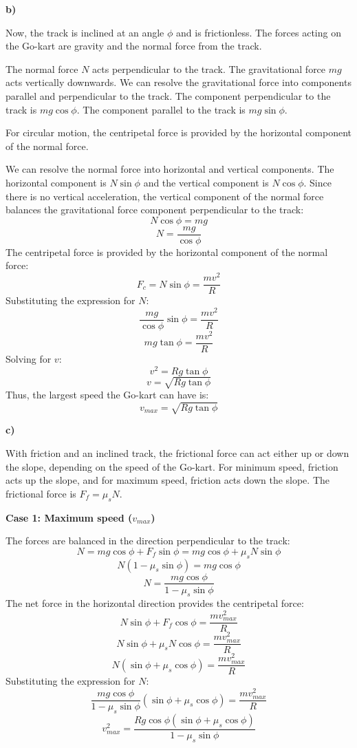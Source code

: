 \documentclass{article}
\begin{document}
\textbf{b)}

Now, the track is inclined at an angle $\phi$ and is frictionless. The forces acting on the Go-kart are gravity and the normal force from the track.

The normal force $N$ acts perpendicular to the track. The gravitational force $mg$ acts vertically downwards. We can resolve the gravitational force into components parallel and perpendicular to the track.
The component perpendicular to the track is $mg\cos\phi$. The component parallel to the track is $mg\sin\phi$.

For circular motion, the centripetal force is provided by the horizontal component of the normal force.

We can resolve the normal force into horizontal and vertical components. The horizontal component is $N\sin\phi$ and the vertical component is $N\cos\phi$.
Since there is no vertical acceleration, the vertical component of the normal force balances the gravitational force component perpendicular to the track:
$$N\cos\phi = mg$$
$$N = \frac{mg}{\cos\phi}$$
The centripetal force is provided by the horizontal component of the normal force:
$$F_c = N\sin\phi = \frac{mv^2}{R}$$
Substituting the expression for $N$:
$$\frac{mg}{\cos\phi} \sin\phi = \frac{mv^2}{R}$$
$$mg\tan\phi = \frac{mv^2}{R}$$
Solving for $v$:
$$v^2 = Rg\tan\phi$$
$$v = \sqrt{Rg\tan\phi}$$
Thus, the largest speed the Go-kart can have is:
$$v_{max} = \sqrt{Rg\tan\phi}$$

\textbf{c)}

With friction and an inclined track, the frictional force can act either up or down the slope, depending on the speed of the Go-kart. For minimum speed, friction acts up the slope, and for maximum speed, friction acts down the slope.
The frictional force is $F_f = \mu_s N$.

\textbf{Case 1: Maximum speed ($v_{max}$)}

The forces are balanced in the direction perpendicular to the track:
$$N = mg\cos\phi + F_f\sin\phi = mg\cos\phi + \mu_s N\sin\phi$$
$$N(1-\mu_s\sin\phi) = mg\cos\phi$$
$$N = \frac{mg\cos\phi}{1-\mu_s\sin\phi}$$
The net force in the horizontal direction provides the centripetal force:
$$N\sin\phi + F_f\cos\phi = \frac{mv_{max}^2}{R}$$
$$N\sin\phi + \mu_s N\cos\phi = \frac{mv_{max}^2}{R}$$
$$N(\sin\phi + \mu_s\cos\phi) = \frac{mv_{max}^2}{R}$$
Substituting the expression for $N$:
$$\frac{mg\cos\phi}{1-\mu_s\sin\phi}(\sin\phi + \mu_s\cos\phi) = \frac{mv_{max}^2}{R}$$
$$v_{max}^2 = \frac{Rg\cos\phi(\sin\phi + \mu_s\cos\phi)}{1-\mu_s\sin\phi}$$
\end{document}
